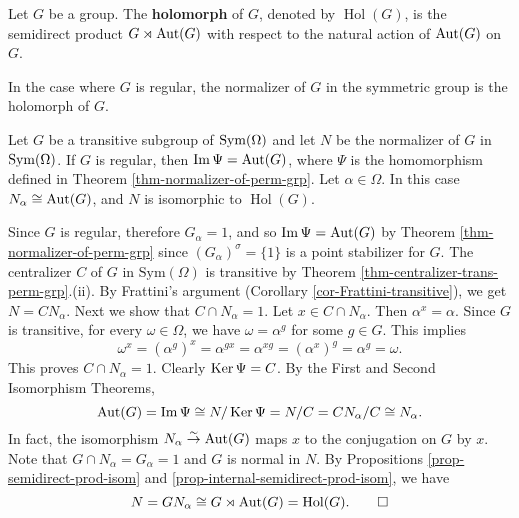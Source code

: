 \begin{definition}
	Let $G$ be a group. The \textbf{holomorph} of $G$, denoted by $\operatorname{Hol} (G)$, is the semidirect product $G \rtimes \operatorname{Aut} (G)$ with respect to the natural action of $\operatorname{Aut} (G)$ on $G$.
\end{definition}
In the case where $G$ is regular,  the normalizer of $G$ in the symmetric group is the holomorph of $G$.
\begin{corollary}
	Let $G$ be a transitive subgroup of $\operatorname{Sym} (\Omega)$ and let $N$ be the normalizer of $G$ in $\operatorname{Sym} (\Omega)$. If $G$ is regular, then $\operatorname{Im}  \Psi = \operatorname{Aut} (G)$, where $\Psi$ is the homomorphism defined in Theorem \ref{thm-normalizer-of-perm-grp}. Let $\alpha\in \Omega$. In this case $N_\alpha \cong \operatorname{Aut} (G)$, and $N$ is isomorphic to $\operatorname{Hol}(G)$.
\end{corollary}
\begin{sketch}
	Since $G$ is regular, therefore $G_\alpha = 1$, and so $\operatorname{Im}  \Psi = \operatorname{Aut} (G)$ by Theorem \ref{thm-normalizer-of-perm-grp} since $(G_\alpha)^{\sigma} = \{1\}$ is a point stabilizer for $G$. The centralizer $C$ of $G$ in $\text{Sym}(\Omega)$ is transitive by Theorem \ref{thm-centralizer-trans-perm-grp}.(ii). By Frattini's argument (Corollary \ref{cor-Frattini-transitive}), we get $N = CN_\alpha$. Next we show that $C \cap N_\alpha = 1$. Let $x\in C \cap N_\alpha$. Then $\alpha^x = \alpha$. Since $G$ is transitive, for every $\omega\in\Omega$, we have $\omega = \alpha^g$ for some $g\in G$. This implies 
	\begin{equation*}
		\omega^x = (\alpha^g)^x =\alpha^{gx} = \alpha^{xg} = (\alpha^x)^g = \alpha^g = \omega. 
	\end{equation*}
	This proves $C \cap N_\alpha = 1$. Clearly $\operatorname{Ker}\Psi = C$. By the First and Second Isomorphism Theorems, 
\begin{equation*}
	\operatorname{Aut} (G) =\operatorname{Im}  \Psi \cong N/\operatorname{Ker} \Psi = N/C = CN_\alpha/C \cong N_\alpha.
\end{equation*} In fact, the isomorphism $N_\alpha\stackrel{\sim}{\rightarrow}\operatorname{Aut} (G)$ maps $x$ to the conjugation on $G$ by $x$. Note that $G \cap N_\alpha = G_\alpha = 1$ and $G$ is normal in $N$. By Propositions \ref{prop-semidirect-prod-isom} and \ref{prop-internal-semidirect-prod-isom}, we have 
\begin{equation*}
	N = GN_\alpha \cong G \rtimes \operatorname{Aut} (G) = \operatorname{Hol}(G). \qedhere
\end{equation*}
\end{sketch} 

